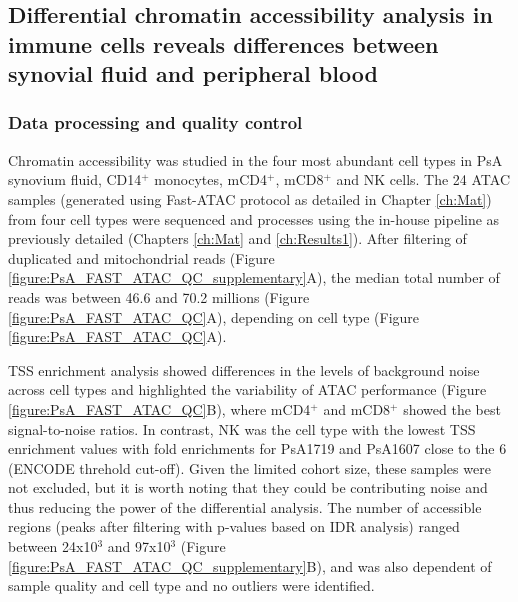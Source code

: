 \subsection{Differential chromatin accessibility analysis in immune cells reveals differences between synovial fluid and peripheral blood}


\subsubsection{Data processing and quality control}
Chromatin accessibility was studied in the four most abundant cell types in PsA synovium fluid, CD14$^+$ monocytes, mCD4$^+$, mCD8$^+$ and NK cells. The 24 ATAC samples (generated using Fast-ATAC protocol as detailed in Chapter \ref{ch:Mat}) from four cell types were sequenced and processes using the in-house pipeline as previously detailed (Chapters \ref{ch:Mat} and \ref{ch:Results1}). After filtering of duplicated and mitochondrial reads (Figure \ref{figure:PsA_FAST_ATAC_QC_supplementary}A), the median total number of reads was between 46.6 and 70.2 millions (Figure \ref{figure:PsA_FAST_ATAC_QC}A), depending on cell type (Figure \ref{figure:PsA_FAST_ATAC_QC}A). %

TSS enrichment analysis showed differences in the levels of background noise across cell types and highlighted the variability of ATAC performance (Figure \ref{figure:PsA_FAST_ATAC_QC}B), where mCD4$^+$ and mCD8$^+$ showed the best signal-to-noise ratios. In contrast, NK was the cell type with the lowest TSS enrichment values with fold enrichments for PsA1719 and PsA1607 close to the 6 (ENCODE threhold cut-off). Given the limited cohort size, these samples were not excluded, but it is worth noting that they could be contributing noise and thus reducing the power of the differential analysis. The number of accessible regions (peaks after filtering with p-values based on IDR analysis) ranged between 24x10$^3$ and 97x10$^3$ (Figure \ref{figure:PsA_FAST_ATAC_QC_supplementary}B), and was also dependent of sample quality and cell type and no outliers were identified.

